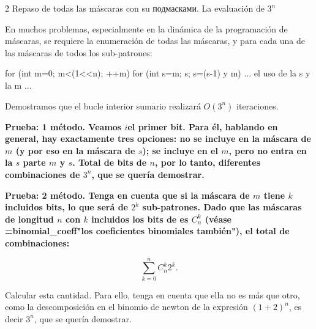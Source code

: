 \h2{ Repaso de todas las máscaras con su подмасками. La evaluación de $3^n$ }

En muchos problemas, especialmente en la dinámica de la programación de máscaras, se requiere la enumeración de todas las máscaras, y para cada una de las máscaras de todos los sub-patrones:

\code
for (int m=0; m<(1<<n); ++m)
for (int s=m; s; s=(s-1) y m)
... el uso de la s y la m ...
\endcode

Demostramos que el bucle interior sumario realizará $O (3^n)$ iteraciones.

\bf{Prueba: 1 método}. Veamos $i$el primer bit. Para él, hablando en general, hay exactamente tres opciones: no se incluye en la máscara de $m$ (y por eso en la máscara de $s$); se incluye en el $m$, pero no entra en la $s$ parte $m$ y $s$. Total de bits de $n$, por lo tanto, diferentes combinaciones de $3^n$, que se quería demostrar.

\bf{Prueba: 2 método}. Tenga en cuenta que si la máscara de $m$ tiene $k$ incluidos bits, lo que será de $2^k$ sub-patrones. Dado que las máscaras de longitud $n$ con $k$ incluidos los bits de es $C_n^k$ (véase \algohref=binomial_coeff{"los coeficientes binomiales también"}), el total de combinaciones:

$$ \sum_{k=0}^n C_n^k 2^k. $$

Calcular esta cantidad. Para ello, tenga en cuenta que ella no es más que otro, como la descomposición en el binomio de newton de la expresión $(1+2)^n$, es decir $3^n$, que se quería demostrar.